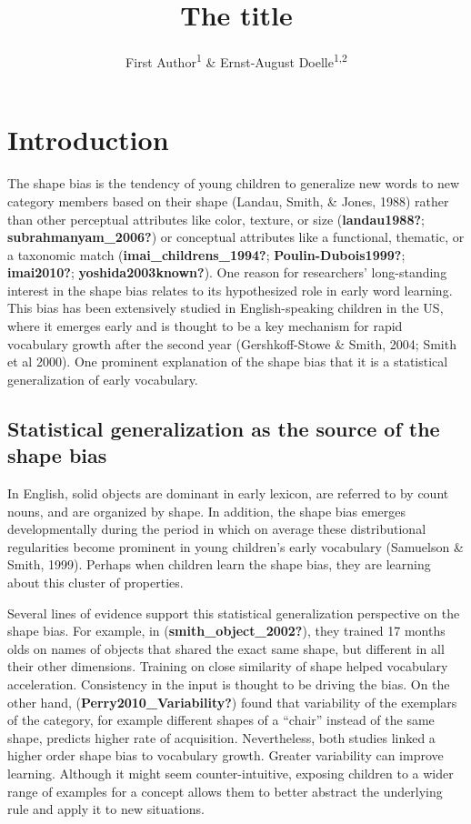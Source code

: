\documentclass[
  american,
  man,floatsintext]{apa6}
\title{The title}
\author{First Author\textsuperscript{1} \& Ernst-August Doelle\textsuperscript{1,2}}
\date{}
\affiliation{\vspace{0.5cm}\textsuperscript{1} Wilhelm-Wundt-University\\\textsuperscript{2} Konstanz Business School}
\begin{document}
\maketitle

\section{Introduction}\label{introduction}

The shape bias is the tendency of young children to generalize new words to new category members based on their shape (Landau, Smith, \& Jones, 1988) rather than other perceptual attributes like color, texture, or size (\textbf{landau1988?}; \textbf{subrahmanyam\_2006?}) or conceptual attributes like a functional, thematic, or a taxonomic match (\textbf{imai\_childrens\_1994?}; \textbf{Poulin-Dubois1999?}; \textbf{imai2010?}; \textbf{yoshida2003known?}). One reason for researchers' long-standing interest in the shape bias relates to its hypothesized role in early word learning. This bias has been extensively studied in English-speaking children in the US, where it emerges early and is thought to be a key mechanism for rapid vocabulary growth after the second year (Gershkoff-Stowe \& Smith, 2004; Smith et al 2000). One prominent explanation of the shape bias that it is a statistical generalization of early vocabulary.

\subsection{Statistical generalization as the source of the shape bias}\label{statistical-generalization-as-the-source-of-the-shape-bias}

In English, solid objects are dominant in early lexicon, are referred to by count nouns, and are organized by shape. In addition, the shape bias emerges developmentally during the period in which on average these distributional regularities become prominent in young children's early vocabulary (Samuelson \& Smith, 1999). Perhaps when children learn the shape bias, they are learning about this cluster of properties.

Several lines of evidence support this statistical generalization perspective on the shape bias. For example, in (\textbf{smith\_object\_2002?}), they trained 17 months olds on names of objects that shared the exact same shape, but different in all their other dimensions. Training on close similarity of shape helped vocabulary acceleration. Consistency in the input is thought to be driving the bias. On the other hand, (\textbf{Perry2010\_Variability?}) found that variability of the exemplars of the category, for example different shapes of a ``chair'' instead of the same shape, predicts higher rate of acquisition. Nevertheless, both studies linked a higher order shape bias to vocabulary growth. Greater variability can improve learning. Although it might seem counter-intuitive, exposing children to a wider range of examples for a concept allows them to better abstract the underlying rule and apply it to new situations.
\end{document}

